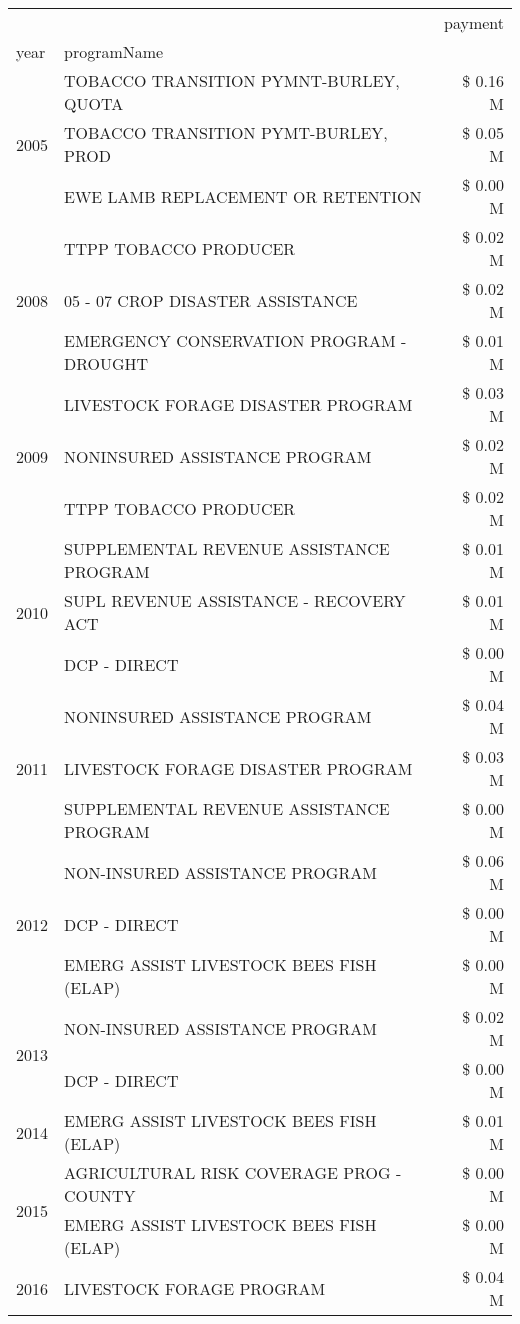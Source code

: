 \begin{tabular}{llr}
\toprule
 &  & payment \\
year & programName &  \\
\midrule
\multirow[t]{3}{*}{2005} & TOBACCO TRANSITION PYMNT-BURLEY, QUOTA & \$ 0.16 M \\
 & TOBACCO TRANSITION PYMT-BURLEY, PROD & \$ 0.05 M \\
 & EWE LAMB REPLACEMENT OR RETENTION & \$ 0.00 M \\
\cline{1-3}
\multirow[t]{3}{*}{2008} & TTPP TOBACCO PRODUCER & \$ 0.02 M \\
 & 05 - 07 CROP DISASTER ASSISTANCE & \$ 0.02 M \\
 & EMERGENCY CONSERVATION PROGRAM - DROUGHT & \$ 0.01 M \\
\cline{1-3}
\multirow[t]{3}{*}{2009} & LIVESTOCK FORAGE DISASTER  PROGRAM & \$ 0.03 M \\
 & NONINSURED ASSISTANCE PROGRAM & \$ 0.02 M \\
 & TTPP TOBACCO PRODUCER & \$ 0.02 M \\
\cline{1-3}
\multirow[t]{3}{*}{2010} & SUPPLEMENTAL REVENUE ASSISTANCE PROGRAM & \$ 0.01 M \\
 & SUPL REVENUE ASSISTANCE - RECOVERY ACT & \$ 0.01 M \\
 & DCP - DIRECT & \$ 0.00 M \\
\cline{1-3}
\multirow[t]{3}{*}{2011} & NONINSURED ASSISTANCE PROGRAM & \$ 0.04 M \\
 & LIVESTOCK FORAGE DISASTER PROGRAM & \$ 0.03 M \\
 & SUPPLEMENTAL REVENUE ASSISTANCE PROGRAM & \$ 0.00 M \\
\cline{1-3}
\multirow[t]{3}{*}{2012} & NON-INSURED ASSISTANCE PROGRAM & \$ 0.06 M \\
 & DCP - DIRECT & \$ 0.00 M \\
 & EMERG ASSIST LIVESTOCK BEES FISH (ELAP) & \$ 0.00 M \\
\cline{1-3}
\multirow[t]{2}{*}{2013} & NON-INSURED ASSISTANCE PROGRAM & \$ 0.02 M \\
 & DCP - DIRECT & \$ 0.00 M \\
\cline{1-3}
2014 & EMERG ASSIST LIVESTOCK BEES FISH (ELAP) & \$ 0.01 M \\
\cline{1-3}
\multirow[t]{2}{*}{2015} & AGRICULTURAL RISK COVERAGE PROG - COUNTY & \$ 0.00 M \\
 & EMERG ASSIST LIVESTOCK BEES FISH (ELAP) & \$ 0.00 M \\
\cline{1-3}
\multirow[t]{3}{*}{2016} & LIVESTOCK FORAGE PROGRAM & \$ 0.04 M \\

\end{tabular}
